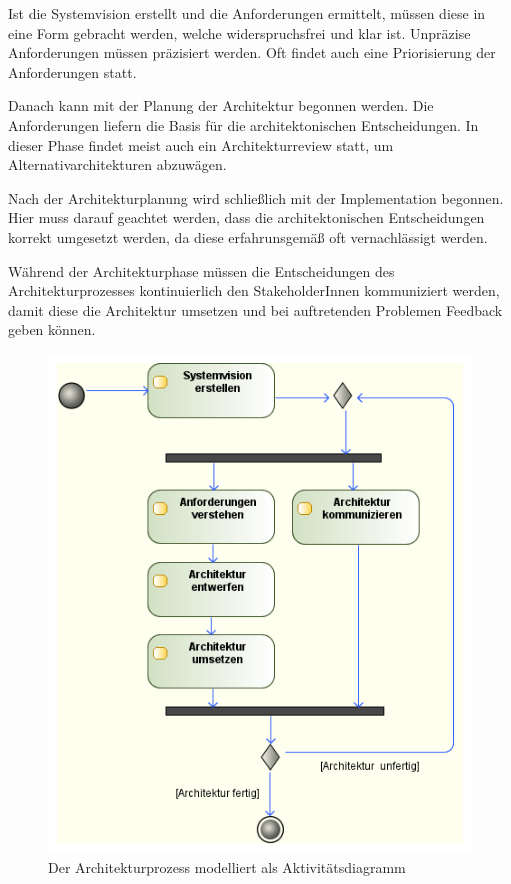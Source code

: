 Ist die Systemvision erstellt und die Anforderungen ermittelt, müssen diese in eine Form gebracht werden, welche widerspruchsfrei und klar ist. Unpräzise Anforderungen müssen präzisiert werden. Oft findet auch eine Priorisierung der Anforderungen statt. \cite[S. 353]{softarch}

Danach kann mit der Planung der Architektur begonnen werden. Die Anforderungen liefern die Basis für die architektonischen Entscheidungen. In dieser Phase findet meist auch ein Architekturreview statt, um Alternativarchitekturen abzuwägen. \cite[S. 353]{softarch}

Nach der Architekturplanung wird schließlich mit der Implementation begonnen. Hier muss darauf geachtet werden, dass die architektonischen Entscheidungen korrekt umgesetzt werden, da diese erfahrunsgemäß oft vernachlässigt werden. \cite[S. 354]{softarch}

Während der Architekturphase müssen die Entscheidungen des Architekturprozesses kontinuierlich den StakeholderInnen kommuniziert werden, damit diese die Architektur umsetzen und bei auftretenden Problemen Feedback geben können. \cite[S. 354]{softarch}

\begin{figure}[H]
    \centering
    \includegraphics[scale=0.6]{img/archcycle.png}
    \caption{Der Architekturprozess modelliert als Aktivitätsdiagramm \cite[Umschlag, S. 352]{softarch}}
    \label{fig:cycle}
\end{figure}

